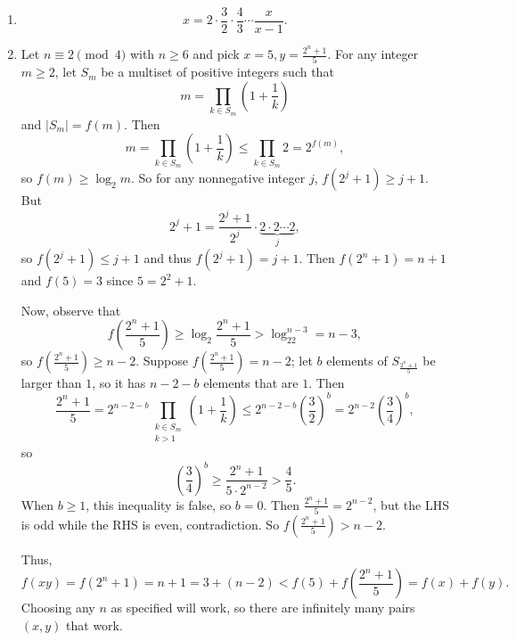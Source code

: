 \begin{enumerate}[label=(\alph*)]
	
	\item \[x=2\cdot\frac{3}{2}\cdot\frac{4}{3}\cdots\frac{x}{x-1}.\]
	
	\item Let $n\equiv2\pmod4$ with $n\geq6$ and pick $x=5,y=\frac{2^n+1}{5}$. For any integer $m\geq2$, let $S_m$ be a multiset of positive integers such that \[m=\displaystyle\prod_{k\in S_m}\left(1+\frac{1}{k}\right)\] and $\left|S_m\right|=f\left(m\right)$. Then \[m=\displaystyle\prod_{k\in S_m}\left(1+\frac{1}{k}\right)\leq\displaystyle\prod_{k\in S_m}2=2^{f\left(m\right)},\] so $f\left(m\right)\geq\log_2m$. So for any nonnegative integer $j$, $f\left(2^j+1\right)\geq j+1$. But \[2^j+1=\frac{2^j+1}{2^j}\cdot\underbrace{2\cdot2\cdots2}_{j},\] so $f\left(2^j+1\right)\leq j+1$ and thus $f\left(2^j+1\right)=j+1$. Then $f\left(2^n+1\right)=n+1$ and $f\left(5\right)=3$ since $5=2^2+1$.
	
	Now, observe that \[f\left(\frac{2^n+1}{5}\right)\geq\log_2\frac{2^n+1}{5}>\log_22^{n-3}=n-3,\] so $f\left(\frac{2^n+1}{5}\right)\geq n-2$. Suppose $f\left(\frac{2^n+1}{5}\right)=n-2$; let $b$ elements of $S_{\frac{2^n+1}{5}}$ be larger than $1$, so it has $n-2-b$ elements that are $1$. Then \[\frac{2^n+1}{5}=2^{n-2-b}\displaystyle\prod_{\substack{k\in S_m \\ k>1}}\left(1+\frac{1}{k}\right)\leq2^{n-2-b}\left(\frac{3}{2}\right)^b=2^{n-2}\left(\frac{3}{4}\right)^b,\] so \[\left(\frac{3}{4}\right)^b\geq\frac{2^n+1}{5\cdot2^{n-2}}>\frac{4}{5}.\] When $b\geq1$, this inequality is false, so $b=0$. Then $\frac{2^n+1}{5}=2^{n-2}$, but the LHS is odd while the RHS is even, contradiction. So $f\left(\frac{2^n+1}{5}\right)>n-2$.
	
	Thus, \[f\left(xy\right)=f\left(2^n+1\right)=n+1=3+\left(n-2\right)<f\left(5\right)+f\left(\frac{2^n+1}{5}\right)=f\left(x\right)+f\left(y\right).\] Choosing any $n$ as specified will work, so there are infinitely many pairs $\left(x,y\right)$ that work.
	
\end{enumerate}
